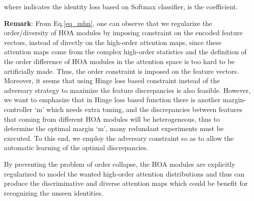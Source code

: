 \documentclass[10pt,twocolumn,letterpaper]{article}
\begin{document}
where  indicates the identity loss based on Softmax classifier,  is the coefficient.

\textbf{Remark}: From Eq.\ref{eq_mhn}, one can observe that we regularize the order/diversity of HOA modules by imposing constraint on the encoded feature vectors, instead of directly on the high-order attention maps, since these attention maps come from the complex high-order statistics and the definition of the order difference of HOA modules in the attention space is too hard to be artificially made. Thus, the order constraint is imposed on the feature vectors. Moreover, it seems that using Hinge loss based constraint instead of the adversary strategy to maximize the feature discrepancies is also feasible. However, we want to emphasize that in Hinge loss based function there is another margin-controller `m' which needs extra tuning, and the discrepancies between features that coming from different HOA modules will be heterogeneous, thus to determine the optimal margin `m', many redundant experiments must be executed. To this end, we employ the adversary constraint so as to allow the automatic learning of the optimal discrepancies.

By preventing the problem of order collapse, the HOA modules are explicitly regularized to model the wanted high-order attention distributions and thus can produce the discriminative and diverse attention maps which could be benefit for recognizing the unseen identities.
\vspace{-0.5em}
\end{document}
